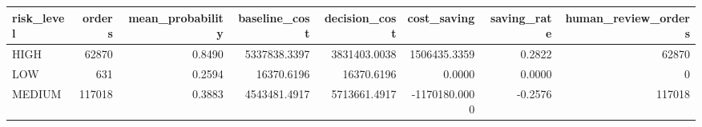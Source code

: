 \begin{tabular}{lrrrrrrr}
\toprule
risk_level & orders & mean_probability & baseline_cost & decision_cost & cost_saving & saving_rate & human_review_orders \\
\midrule
HIGH & 62870 & 0.8490 & 5337838.3397 & 3831403.0038 & 1506435.3359 & 0.2822 & 62870 \\
LOW & 631 & 0.2594 & 16370.6196 & 16370.6196 & 0.0000 & 0.0000 & 0 \\
MEDIUM & 117018 & 0.3883 & 4543481.4917 & 5713661.4917 & -1170180.0000 & -0.2576 & 117018 \\
\bottomrule
\end{tabular}
